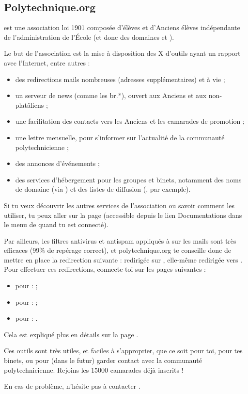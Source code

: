 \subsection{Polytechnique.org}
 est une association loi 1901 composée d'élèves et d'Anciens élèves
 indépendante de l'administration de l'\'Ecole (et donc des domaines 
 et ).

Le but de l'association est la mise à disposition des X d'outils
ayant un rapport avec l'Internet, entre autres :
\begin{itemize}
  \item des redirections mails nombreuses (adresses supplémentaires) et à vie ;
  \item un serveur de news (comme les br.*), ouvert aux Anciens et aux non-platâliens ;
  \item une facilitation des contacts vers les Anciens et les camarades de promotion ;
  \item une lettre mensuelle, pour s'informer sur l'actualité de la communauté polytechnicienne ;
  \item des annonces d'événements ;
  \item des services d'hébergement pour les groupes et binets, notamment des noms de domaine (via ) et des listes de diffusion (, par exemple).
\end{itemize}
Si tu veux découvrir les autres services de l'association ou savoir
comment les utiliser, tu peux aller sur la page
 (accessible depuis
le lien Documentations dans le menu de 
quand tu est connecté).

Par ailleurs, les filtres antivirus et antispam appliqués à sur les mails sont très efficaces (99\% de repérage correct), et polytechnique.org te conseille donc de mettre en place la redirection suivante :
redirigée sur ,
elle-même redirigée vers .
Pour effectuer ces redirections, connecte-toi sur les pages suivantes :
\begin{itemize}
  \item pour  :  ;
  \item pour  :  ;
  \item pour  : .
\end{itemize}
Cela est expliqué plus en détails sur la page
.

Ces outils sont très utiles, et faciles à s'approprier, que
ce soit pour toi, pour tes binets, ou pour (dans le
futur) garder contact avec la communauté polytechnicienne. Rejoins
les 15000 camarades déjà inscrits !

En cas de problème, n'hésite pas à contacter
.
